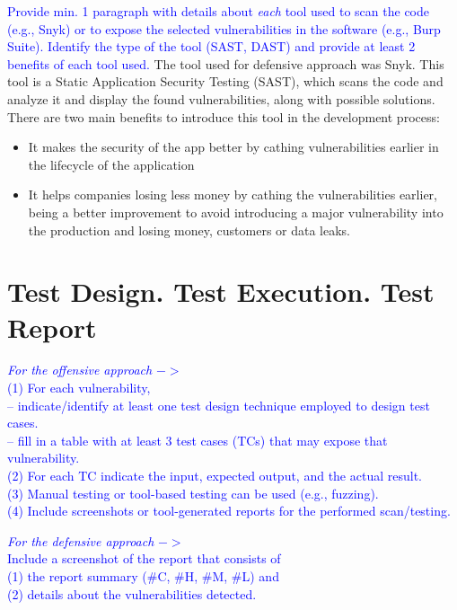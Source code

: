 \documentclass{article}
\begin{document}
\textcolor{blue}{Provide min. 1 paragraph with details about \textit{each} tool used to scan the code (e.g., Snyk) or to expose the selected vulnerabilities in the software (e.g., Burp Suite).
    Identify the type of the tool (SAST, DAST) and provide at least 2 benefits of each tool used.
}
The tool used for defensive approach was Snyk. This tool is a Static Application Security Testing (SAST), which scans the code and analyze it and display the found vulnerabilities, along with possible solutions. There are two main benefits to introduce this tool in the development process:
\begin{itemize}
    \item It makes the security of the app better by cathing vulnerabilities earlier in the lifecycle of the application
    \item It helps companies losing less money by cathing the vulnerabilities earlier, being a better improvement to avoid introducing a major vulnerability into the production and losing money, customers or data leaks.
\end{itemize}

\section{Test Design. Test Execution. Test Report}
\label{}

\textcolor{blue}{\textit{For the offensive approach} $->$\\
    (1) For each vulnerability, \\
    -- indicate/identify at least one test design technique employed to design test cases.\\
    -- fill in a table with at least 3 test cases (TCs) that may expose that vulnerability.\\
    (2) For each TC indicate the input, expected output, and the actual result.\\
    (3) Manual testing or tool-based testing can be used (e.g., fuzzing).\\
    (4) Include screenshots or tool-generated reports for the performed scan/testing.}

\textcolor{blue}{\textit{For the defensive approach} $->$\\
    Include a screenshot of the report that consists of \\
    (1) the report summary (\#C, \#H, \#M, \#L) and \\
    (2) details about the vulnerabilities detected.}
\end{document}
